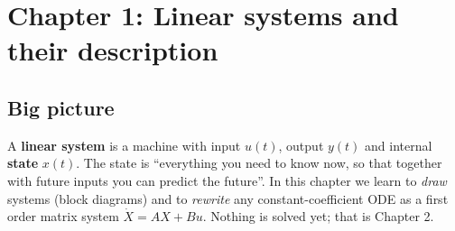 
\section{Chapter 1: Linear systems and their description \texorpdfstring{}{}}
\label{ch1}

\subsection*{Big picture}
A \textbf{linear system} is a machine with input $u(t)$, output $y(t)$ and internal \textbf{state} $x(t)$.
The state is ``everything you need to know now, so that together with future inputs you can predict the future''.
In this chapter we learn to \emph{draw} systems (block diagrams) and to \emph{rewrite} any constant-coefficient ODE as a first order
matrix system $\dot X=AX+Bu$. Nothing is solved yet; that is Chapter 2.

